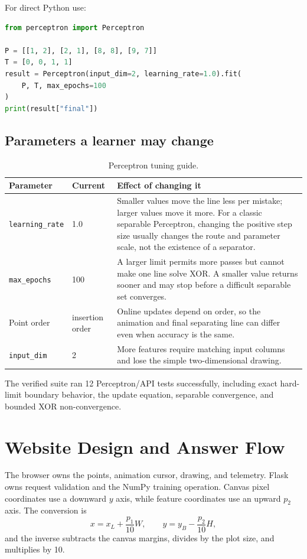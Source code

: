 \documentclass[12pt,a4paper,openany]{report}
\begin{document}
For direct Python use:
\begin{lstlisting}[language=Python,caption={Train without the website.}]
from perceptron import Perceptron

P = [[1, 2], [2, 1], [8, 8], [9, 7]]
T = [0, 0, 1, 1]
result = Perceptron(input_dim=2, learning_rate=1.0).fit(
    P, T, max_epochs=100
)
print(result["final"])
\end{lstlisting}

\subsection{Parameters a learner may change}
\begin{table}[H]
\centering\small
\caption{Perceptron tuning guide.}
\begin{tabularx}{\textwidth}{p{}p{}Y}
\toprule
\textbf{Parameter} & \textbf{Current} & \textbf{Effect of changing it} \\
\midrule
\texttt{learning\_rate} & 1.0 & Smaller values move the line less per mistake; larger values move it more. For a classic separable Perceptron, changing the positive step size usually changes the route and parameter scale, not the existence of a separator. \\
\texttt{max\_epochs} & 100 & A larger limit permits more passes but cannot make one line solve XOR. A smaller value returns sooner and may stop before a difficult separable set converges. \\
Point order & insertion order & Online updates depend on order, so the animation and final separating line can differ even when accuracy is the same. \\
\texttt{input\_dim} & 2 & More features require matching input columns and lose the simple two-dimensional drawing. \\
\bottomrule
\end{tabularx}
\end{table}

The verified suite ran 12 Perceptron/API tests successfully, including exact
hard-limit boundary behavior, the update equation, separable convergence, and
bounded XOR non-convergence.

\section{Website Design and Answer Flow}
The browser owns the points, animation cursor, drawing, and telemetry. Flask
owns request validation and the NumPy training operation. Canvas pixel
coordinates use a downward $y$ axis, while feature coordinates use an upward
$p_2$ axis. The conversion is
\begin{equation}
x=x_L+\frac{p_1}{10}W,\qquad
y=y_B-\frac{p_2}{10}H,
\end{equation}
and the inverse subtracts the canvas margins, divides by the plot size, and
multiplies by 10.
\end{document}

